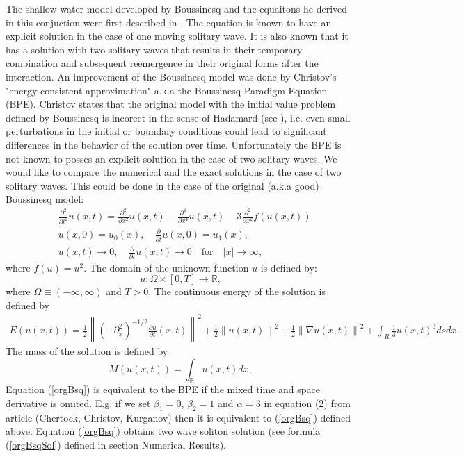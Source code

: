 \documentclass[%
 aip,
cp,  
 amsmath,amssymb,
 reprint,
]{iopconfser}
\newcommand{\be}{\begin{equation}}
\newcommand{\ee}{\end{equation}}
\newcommand{\rf}[1]{(\ref{#1})}
\newcommand{\RR}{\mathbb{R}}
\begin{document}
The shallow water model developed by Boussinesq and the equaitons he derived in this conjuction were first described in \cite{ref0}. The equation is known to have an explicit solution in the case of one moving solitary wave. It is also known that it has a solution with two solitary waves that results in their temporary combination and subsequent reemergence in their original forms after the interaction. An improvement of the Boussinesq model was done by Christov's "energy-consistent approximation" \cite{ref1} a.k.a the Boussinesq Paradigm Equation (BPE). Christov states that the original model with the initial value problem defined by Boussinesq is incorect in the sense of Hadamard (see \cite{ref1}), i.e. even small perturbations in the initial or boundary conditions could lead to significant differences in the behavior of the solution over time. Unfortunately the BPE is not known to posses an explicit solution in the case of two solitary waves. We would like to compare the numerical and the exact solutions in the case of two solitary waves. This could be done in the case of the original (a.k.a good) Boussinesq model:
\begin{align}\label{orgBsq}
&\frac{\partial^2 }{\partial t^2}u(x,t)= \frac{\partial^2}{\partial x^2}u(x,t) -  \frac{\partial^4}{\partial x^4}u(x,t) - 3\frac{\partial^2}{\partial x^2} f(u(x,t))
\\
&u(x,0) = u_0(x), \quad \frac{\partial }{\partial t}u(x,0)=u_1(x), \nonumber
\\
&u(x,t) \rightarrow 0, \quad \frac{\partial }{\partial t} u(x, t) \rightarrow 0 \quad \text{for} \quad |x| \rightarrow \infty, \nonumber
\end{align}
where $f(u) = u^2$. The domain of the unknown function $u$ is defined by:
\be
 u:\Omega \times [0, T] \rightarrow \RR,
\ee
where $\Omega \equiv (-\infty, \infty)$ and $T>0$. The continuous energy of the solution is defined by
\begin{eqnarray}\label{con-cont2}
E\left( u(x,t)\right)=	\frac{1}{2} \left\|(-\partial^2_x)^{-1/2} \frac{\partial u}{\partial t}(x,t)\right\|^2 + \frac{1}{2}  \left\|u (x,t)\right\|^2 
+ \frac{1}{2}\left\| \nabla u(x,t) \right\|^2+ \int _{R}  \frac{1}{3} u(x,t)^3 ds dx.
\end{eqnarray}
The mass of the solution is defined by
\begin{equation}\label{intM}
M(u(x,t))=\int_{\RR} u(x,t)dx,
\end{equation}
Equation \rf{orgBsq} is equivalent to the BPE if the mixed time and space derivative is omited. E.g. if we set $\beta_1 = 0$, $\beta_2 = 1$ and $\alpha = 3$ in equation (2) from article \cite{ref21} (Chertock, Christov, Kurganov) then it is equivalent to \rf{orgBsq} defined above. Equation \rf{orgBsq} obtains two wave soliton solution (see formula \rf{orgBsqSol} defined in section Numerical Results).
\end{document}
